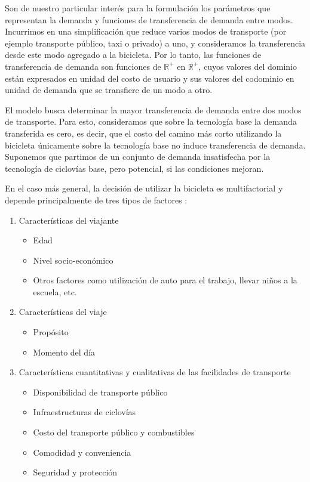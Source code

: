 Son de nuestro particular interés para la formulación los parámetros que representan la demanda y funciones de transferencia de demanda entre modos. Incurrimos en una simplificación que reduce varios modos de transporte (por ejemplo transporte público, taxi o privado) a uno, y consideramos la transferencia desde este modo agregado a la bicicleta. Por lo tanto, las funciones de transferencia de demanda son funciones de $\mathbb{R}^+$ en $\mathbb{R}^+$, cuyos valores del dominio están expresados en unidad del costo de usuario y sus valores del codominio en unidad de demanda que se transfiere de un modo a otro.

El modelo busca determinar la mayor transferencia de demanda entre dos modos de transporte. Para esto, consideramos que sobre la tecnología base la demanda transferida es cero, es decir, que el costo del camino más corto utilizando la bicicleta únicamente sobre la tecnología base no induce transferencia de demanda. Suponemos que partimos de un conjunto de demanda insatisfecha por la tecnología de ciclovías base, pero potencial, si las condiciones mejoran.

En el caso más general, la decisión de utilizar la bicicleta es multifactorial y depende principalmente de tres tipos de factores \parencite{ortuz2011}:

\begin{enumerate}
  \item{
      Características del viajante
        \begin{itemize}
          \item{Edad}
          \item{Nivel socio-económico}
          \item{Otros factores como utilización de auto para el trabajo, llevar niños a la escuela, etc.}
        \end{itemize}
  }
  \item{
      Características del viaje
        \begin{itemize}
          \item{Propósito}
          \item{Momento del día}
        \end{itemize}
  }
\item{\label{bicycleusagefactors}
      Características cuantitativas y cualitativas de las facilidades de transporte
      \begin{itemize}
          \item{Disponibilidad de transporte público}
          \item{Infraestructuras de ciclovías}
          \item{Costo del transporte público y combustibles}
          \item{Comodidad y conveniencia}
          \item{Seguridad y protección}
      \end{itemize}
  }
\end{enumerate}

